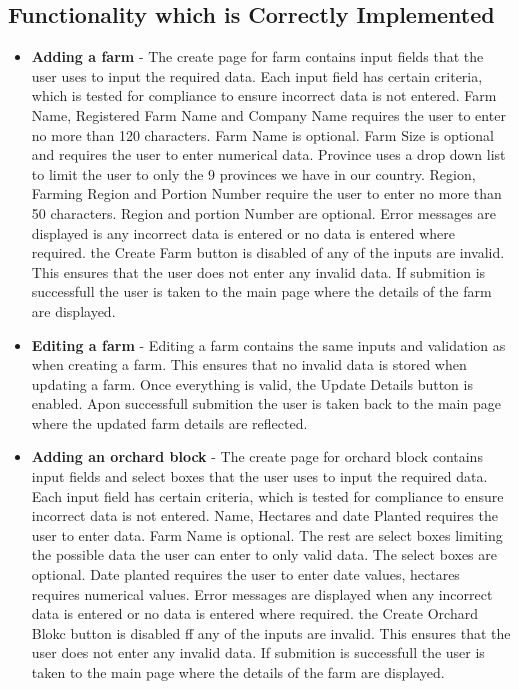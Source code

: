 \documentclass[11pt,fleqn]{book} %
\begin{document}
		\subsection{Functionality which is Correctly Implemented}
			\begin{itemize}
				\item\textbf{Adding a farm} -
				The create page for farm contains input fields that the user uses to input the required data. Each input field has certain criteria, which is tested for compliance to ensure incorrect data is not entered. Farm Name, Registered Farm Name and Company Name requires the user to enter no more than 120 characters. Farm Name is optional. Farm Size is optional and requires the user to enter numerical data. Province uses a drop down list to limit the user to only the 9 provinces we have in our country. Region, Farming Region and Portion Number require the user to enter no more than 50 characters. Region and portion Number are optional. Error messages are displayed is any incorrect data is entered or no data is entered where required. the Create Farm button is disabled of any of the inputs are invalid. This ensures that the user does not enter any invalid data. If submition is successfull the user is taken to the main page where the details of the farm are displayed.
				
				
				\item\textbf{Editing a farm} -
				Editing a farm contains the same inputs and validation as when creating a farm. This ensures that no invalid data is stored when updating a farm. Once everything is valid, the Update Details button is enabled. Apon successfull submition the user is taken back to the main page where the updated farm details are reflected.
				
				\item\textbf{Adding an orchard block} -
				The create page for orchard block contains input fields and select boxes that the user uses to input the required data. Each input field has certain criteria, which is tested for compliance to ensure incorrect data is not entered. Name, Hectares and date Planted requires the user to enter data. Farm Name is optional. The rest are select boxes limiting the possible data the user can enter to only valid data. The select boxes are optional. Date planted requires the user to enter date values, hectares requires numerical values. Error messages are displayed when any incorrect data is entered or no data is entered where required. the Create Orchard Blokc button is disabled ff any of the inputs are invalid. This ensures that the user does not enter any invalid data. If submition is successfull the user is taken to the main page where the details of the farm are displayed.
				

\end{itemize}
\end{document}
